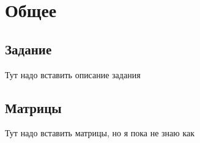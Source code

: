 \documentclass[../../report.tex]{subfiles}
\begin{document}
\chapter{Общее}

\section{Задание}
    Тут надо вставить описание задания

\section{Матрицы}
    Тут надо вставить матрицы, но я пока не знаю как
\end{document}
